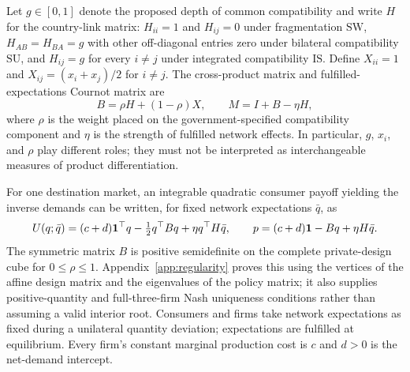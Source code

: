 \documentclass[11pt,a4paper]{article}
\theoremstyle{remark}\newtheorem{remark}[theorem]{Remark}
\newcommand{\SW}{\mathrm{SW}}\newcommand{\SU}{\mathrm{SU}}\newcommand{\IS}{\mathrm{IS}}
\begin{document}
Let $g\in[0,1]$ denote the proposed depth of common compatibility and write $H$ for the country-link matrix: $H_{ii}=1$ and $H_{ij}=0$ under fragmentation $\SW$, $H_{AB}=H_{BA}=g$ with other off-diagonal entries zero under bilateral compatibility $\SU$, and $H_{ij}=g$ for every $i\ne j$ under integrated compatibility $\IS$. Define $X_{ii}=1$ and $X_{ij}=(x_i+x_j)/2$ for $i\ne j$. The cross-product matrix and fulfilled-expectations Cournot matrix are
\begin{equation}\label{eq:matrices}
B=\rho H+(1-\rho)X,\qquad M=I+B-\eta H,
\end{equation}
where $\rho$ is the weight placed on the government-specified compatibility component and $\eta$ is the strength of fulfilled network effects. In particular, $g$, $x_i$, and $\rho$ play different roles; they must not be interpreted as interchangeable measures of product differentiation.

For one destination market, an integrable quadratic consumer payoff yielding the inverse demands can be written, for fixed network expectations $\bar{q}$, as
\begin{equation}\label{eq:consumer}
U(q;\bar q)=(c+d)\boldsymbol{1}^{\top}q-\tfrac12q^{\top}Bq+\eta q^{\top}H\bar q,\qquad
p=(c+d)\boldsymbol{1}-Bq+\eta H\bar q.
\end{equation}
The symmetric matrix $B$ is positive semidefinite on the complete private-design cube for $0\le\rho\le1$. Appendix~\ref{app:regularity} proves this using the vertices of the affine design matrix and the eigenvalues of the policy matrix; it also supplies positive-quantity and full-three-firm Nash uniqueness conditions rather than assuming a valid interior root. Consumers and firms take network expectations as fixed during a unilateral quantity deviation; expectations are fulfilled at equilibrium. Every firm's constant marginal production cost is $c$ and $d>0$ is the net-demand intercept.
\end{document}
